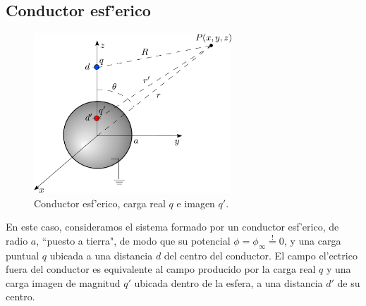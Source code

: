 \subsection{Conductor esf'erico}
\begin{figure}[!h]
\centerline{\includegraphics[height=6cm]{fig/fig-carga-imagen-02.pdf}}
\caption{Conductor esf'erico, carga real $q$ e imagen $q'$.}
\label{ci02}
\end{figure}
En este caso, consideramos el sistema formado por un conductor esf'erico, de radio $a$, ``puesto a tierra", de modo que su potencial $\phi=\phi_\infty\stackrel{!}{=}0$, y una carga puntual $q$ ubicada a una distancia $d$ del centro del conductor. El campo el'ectrico fuera del conductor es equivalente al campo producido por la carga real $q$ y una carga imagen de magnitud $q'$ ubicada dentro de la esfera, a una distancia $d'$ de su centro. 

